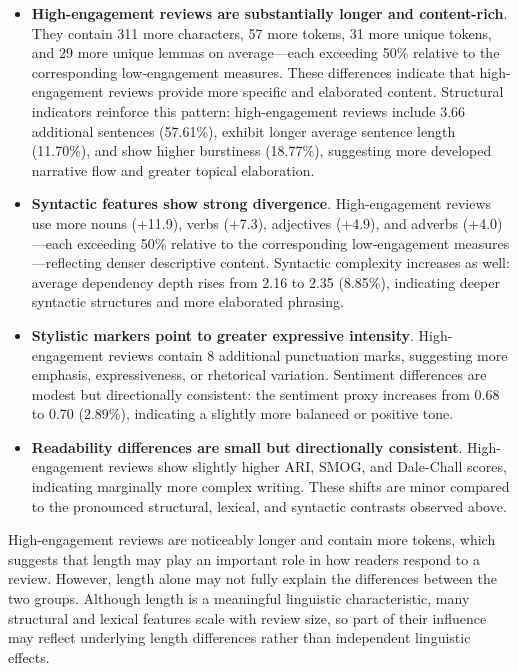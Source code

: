 \documentclass[12pt]{article}
\begin{document}
\begin{itemize}

\item \textbf{High-engagement reviews are substantially longer and content-rich}.  
They contain 311 more characters, 57 more tokens, 31 more unique tokens, and 29 more unique lemmas on average—each exceeding 50\% relative to the corresponding low-engagement measures. These differences indicate that high-engagement reviews provide more specific and elaborated content. Structural indicators reinforce this pattern: high-engagement reviews include 3.66 additional sentences (57.61\%), exhibit longer average sentence length (11.70\%), and show higher burstiness (18.77\%), suggesting more developed narrative flow and greater topical elaboration.

\item \textbf{Syntactic features show strong divergence}.  
High-engagement reviews use more nouns (+11.9), verbs (+7.3), adjectives (+4.9), and adverbs (+4.0)—each exceeding 50\% relative to the corresponding low-engagement measures—reflecting denser descriptive content. Syntactic complexity increases as well: average dependency depth rises from 2.16 to 2.35 (8.85\%), indicating deeper syntactic structures and more elaborated phrasing.

\item \textbf{Stylistic markers point to greater expressive intensity}.  
High-engagement reviews contain 8 additional punctuation marks, suggesting more emphasis, expressiveness, or rhetorical variation. Sentiment differences are modest but directionally consistent: the sentiment proxy increases from 0.68 to 0.70 (2.89\%), indicating a slightly more balanced or positive tone.

\item \textbf{Readability differences are small but directionally consistent}.  
High-engagement reviews show slightly higher ARI, SMOG, and Dale-Chall scores, indicating marginally more complex writing. These shifts are minor compared to the pronounced structural, lexical, and syntactic contrasts observed above.

\end{itemize}


High-engagement reviews are noticeably longer and contain more tokens, which suggests that length may play an important role in how readers respond to a review.
However, length alone may not fully explain the differences between the two groups.
Although length is a meaningful linguistic characteristic, many structural and lexical features scale with review size, so part of their influence may reflect underlying length differences rather than independent linguistic effects.  
\end{document}
